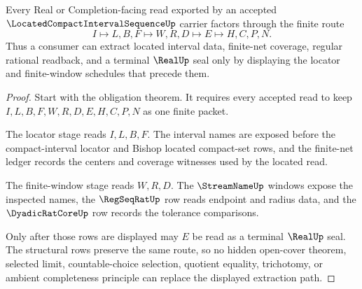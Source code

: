 \begin{theorem}
\label{thm:located-compact-interval-sequence-extraction}
Every Real or Completion-facing read exported by an accepted $\LocatedCompactIntervalSequenceUp$ carrier factors through the finite route
$$
I \longmapsto L,B,F \longmapsto W,R,D \longmapsto E \longmapsto H,C,P,N .
$$
Thus a consumer can extract located interval data, finite-net coverage, regular rational readback, and a terminal $\RealUp$ seal only by displaying the locator and finite-window schedules that precede them.
\end{theorem}
\begin{proof}
Start with the obligation theorem. It requires every accepted read to keep $I,L,B,F,W,R,D,E,H,C,P,N$ as one finite packet.

The locator stage reads $I,L,B,F$. The interval names are exposed before the compact-interval locator and Bishop located compact-set rows, and the finite-net ledger records the centers and coverage witnesses used by the located read.

The finite-window stage reads $W,R,D$. The $\StreamNameUp$ windows expose the inspected names, the $\RegSeqRatUp$ row reads endpoint and radius data, and the $\DyadicRatCoreUp$ row records the tolerance comparisons.

Only after those rows are displayed may $E$ be read as a terminal $\RealUp$ seal. The structural rows preserve the same route, so no hidden open-cover theorem, selected limit, countable-choice selection, quotient equality, trichotomy, or ambient completeness principle can replace the displayed extraction path.
\end{proof}

